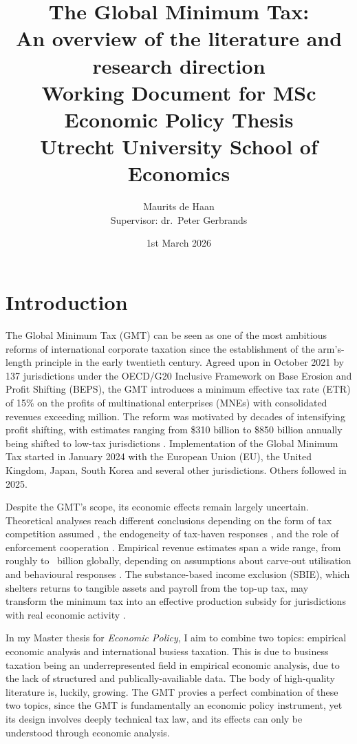 \documentclass[11pt,a4paper]{article}
\title{\textbf{The Global Minimum Tax: \\ An overview of the literature and \\ research direction}\\[0.5em]
\large Working Document for MSc Economic Policy Thesis\\
Utrecht University School of Economics}
\author{Maurits de Haan\\[0.3em]
\small Supervisor: dr.\ Peter Gerbrands}
\date{1st March 2026}
\newcommand{\EUR}{\texteuro}
\begin{document}
\maketitle

\newpage
\tableofcontents
\newpage

\section{Introduction}\label{sec:introduction}

The Global Minimum Tax (GMT) can be seen as one of the most ambitious reforms of international corporate taxation since the establishment of the arm's-length principle in the early twentieth century. Agreed upon in October 2021 by 137 jurisdictions under the OECD/G20 Inclusive Framework on Base Erosion and Profit Shifting (BEPS), the GMT introduces a minimum effective tax rate (ETR) of 15\% on the profits of multinational enterprises (MNEs) with consolidated revenues exceeding \EUR 750 million. The reform was motivated by decades of intensifying profit shifting, with estimates ranging from \$310 billion to \$850 billion annually being shifted to low-tax jurisdictions \citep{torslov2022, garcia2024, blouin2023}. Implementation of the Global Minimum Tax started in January 2024 with the European Union (EU), the United Kingdom, Japan, South Korea and several other jurisdictions. Others followed in 2025. 

Despite the GMT's scope, its economic effects remain largely uncertain. Theoretical analyses reach different conclusions depending on the form of tax competition assumed \parencite{janeba2023}, the endogeneity of tax-haven responses \parencite{Johannesen2022}, and the role of enforcement cooperation \parencite{hindriks2025}. Empirical revenue estimates span a wide range, from roughly  to ~billion globally, depending on assumptions about carve-out utilisation and behavioural responses \parencite{barake2022}. The substance-based income exclusion (SBIE), which shelters returns to tangible assets and payroll from the top-up tax, may transform the minimum tax into an effective production subsidy for jurisdictions with real economic activity \parencite{schjelderup2024}.

In my Master thesis for \emph{Economic Policy}, I aim to combine two topics: empirical economic analysis and international busiess taxation. This is due to business taxation being an underrepresented field in empirical economic analysis, due to the lack of structured and publically-availiable data. The body of high-quality literature is, luckily, growing. The GMT provies a perfect combination of these two topics, since the GMT is fundamentally an economic policy instrument, yet its design involves deeply technical tax law, and its effects can only be understood through economic analysis.
\end{document}
